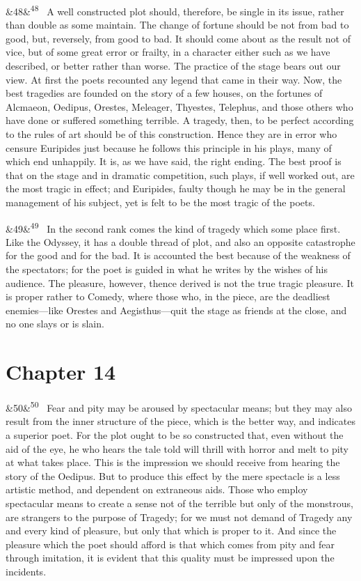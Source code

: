 \documentclass[12pt]{article}
\newcommand{\para}[1][]{\par\noindent\ifx&#1&\else\textsuperscript{\footnotesize #1}~\fi}
\begin{document}
\para[48] A well constructed plot should, therefore, be single in its issue, rather than double as some maintain. The change of fortune should be not from bad to good, but, reversely, from good to bad. It should come about as the result not of vice, but of some great error or frailty, in a character either such as we have described, or better rather than worse. The practice of the stage bears out our view. At first the poets recounted any legend that came in their way. Now, the best tragedies are founded on the story of a few houses, on the fortunes of Alcmaeon, Oedipus, Orestes, Meleager, Thyestes, Telephus, and those others who have done or suffered something terrible. A tragedy, then, to be perfect according to the rules of art should be of this construction. Hence they are in error who censure Euripides just because he follows this principle in his plays, many of which end unhappily. It is, as we have said, the right ending. The best proof is that on the stage and in dramatic competition, such plays, if well worked out, are the most tragic in effect; and Euripides, faulty though he may be in the general management of his subject, yet is felt to be the most tragic of the poets.

\para[49] In the second rank comes the kind of tragedy which some place first. Like the Odyssey, it has a double thread of plot, and also an opposite catastrophe for the good and for the bad. It is accounted the best because of the weakness of the spectators; for the poet is guided in what he writes by the wishes of his audience. The pleasure, however, thence derived is not the true tragic pleasure. It is proper rather to Comedy, where those who, in the piece, are the deadliest enemies---like Orestes and Aegisthus---quit the stage as friends at the close, and no one slays or is slain.

\section*{Chapter 14}

\para[50] Fear and pity may be aroused by spectacular means; but they may also result from the inner structure of the piece, which is the better way, and indicates a superior poet. For the plot ought to be so constructed that, even without the aid of the eye, he who hears the tale told will thrill with horror and melt to pity at what takes place. This is the impression we should receive from hearing the story of the Oedipus. But to produce this effect by the mere spectacle is a less artistic method, and dependent on extraneous aids. Those who employ spectacular means to create a sense not of the terrible but only of the monstrous, are strangers to the purpose of Tragedy; for we must not demand of Tragedy any and every kind of pleasure, but only that which is proper to it. And since the pleasure which the poet should afford is that which comes from pity and fear through imitation, it is evident that this quality must be impressed upon the incidents.
\end{document}
